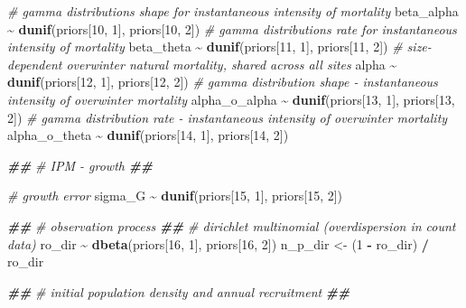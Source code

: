 \documentclass[
]{article}
\newenvironment{Shaded}{\begin{snugshade}}{\end{snugshade}}
\newcommand{\CommentTok}[1]{\textcolor[rgb]{0.56,0.35,0.01}{\textit{#1}}}
\newcommand{\DecValTok}[1]{\textcolor[rgb]{0.00,0.00,0.81}{#1}}
\newcommand{\DocumentationTok}[1]{\textcolor[rgb]{0.56,0.35,0.01}{\textbf{\textit{#1}}}}
\newcommand{\FunctionTok}[1]{\textcolor[rgb]{0.13,0.29,0.53}{\textbf{#1}}}
\newcommand{\NormalTok}[1]{#1}
\newcommand{\OtherTok}[1]{\textcolor[rgb]{0.56,0.35,0.01}{#1}}
\newcommand{\SpecialCharTok}[1]{\textcolor[rgb]{0.81,0.36,0.00}{\textbf{#1}}}
\begin{document}
\begin{Shaded}
\begin{Highlighting}[]
  \CommentTok{\# gamma distributions shape for instantaneous intensity of mortality}
\NormalTok{  beta\_alpha }\SpecialCharTok{\textasciitilde{}} \FunctionTok{dunif}\NormalTok{(priors[}\DecValTok{10}\NormalTok{, }\DecValTok{1}\NormalTok{], priors[}\DecValTok{10}\NormalTok{, }\DecValTok{2}\NormalTok{])}
  \CommentTok{\# gamma distributions rate for instantaneous intensity of mortality}
\NormalTok{  beta\_theta }\SpecialCharTok{\textasciitilde{}} \FunctionTok{dunif}\NormalTok{(priors[}\DecValTok{11}\NormalTok{, }\DecValTok{1}\NormalTok{], priors[}\DecValTok{11}\NormalTok{, }\DecValTok{2}\NormalTok{])}
  \CommentTok{\# size{-}dependent overwinter natural mortality, shared across all sites}
\NormalTok{  alpha }\SpecialCharTok{\textasciitilde{}} \FunctionTok{dunif}\NormalTok{(priors[}\DecValTok{12}\NormalTok{, }\DecValTok{1}\NormalTok{], priors[}\DecValTok{12}\NormalTok{, }\DecValTok{2}\NormalTok{])}
  \CommentTok{\# gamma distribution shape {-} instantaneous intensity of overwinter mortality}
\NormalTok{  alpha\_o\_alpha }\SpecialCharTok{\textasciitilde{}} \FunctionTok{dunif}\NormalTok{(priors[}\DecValTok{13}\NormalTok{, }\DecValTok{1}\NormalTok{], priors[}\DecValTok{13}\NormalTok{, }\DecValTok{2}\NormalTok{])}
  \CommentTok{\# gamma distribution rate {-} instantaneous intensity of overwinter mortality}
\NormalTok{  alpha\_o\_theta }\SpecialCharTok{\textasciitilde{}} \FunctionTok{dunif}\NormalTok{(priors[}\DecValTok{14}\NormalTok{, }\DecValTok{1}\NormalTok{], priors[}\DecValTok{14}\NormalTok{, }\DecValTok{2}\NormalTok{])}

  \DocumentationTok{\#\#}
  \CommentTok{\# IPM {-} growth}
  \DocumentationTok{\#\#}
  
  \CommentTok{\# growth error}
\NormalTok{  sigma\_G }\SpecialCharTok{\textasciitilde{}} \FunctionTok{dunif}\NormalTok{(priors[}\DecValTok{15}\NormalTok{, }\DecValTok{1}\NormalTok{], priors[}\DecValTok{15}\NormalTok{, }\DecValTok{2}\NormalTok{])}

  \DocumentationTok{\#\#}
  \CommentTok{\# observation process}
  \DocumentationTok{\#\#}
  \CommentTok{\# dirichlet multinomial (overdispersion in count data)}
\NormalTok{  ro\_dir }\SpecialCharTok{\textasciitilde{}} \FunctionTok{dbeta}\NormalTok{(priors[}\DecValTok{16}\NormalTok{, }\DecValTok{1}\NormalTok{], priors[}\DecValTok{16}\NormalTok{, }\DecValTok{2}\NormalTok{])}
\NormalTok{  n\_p\_dir }\OtherTok{\textless{}{-}}\NormalTok{ (}\DecValTok{1} \SpecialCharTok{{-}}\NormalTok{ ro\_dir) }\SpecialCharTok{/}\NormalTok{ ro\_dir}

  \DocumentationTok{\#\#}
  \CommentTok{\# initial population density and annual recruitment}
  \DocumentationTok{\#\#}


\end{Highlighting}
\end{Shaded}
\end{document}
